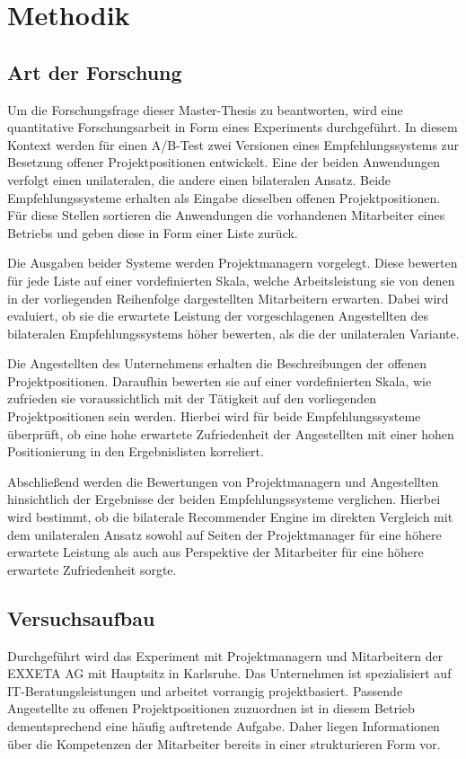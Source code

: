 \chapter{Methodik}
\label{ch:methodik}

\section{Art der Forschung}
\label{ch:methodik:art}
Um die Forschungsfrage dieser Master-Thesis zu beantworten, wird eine quantitative Forschungsarbeit in Form eines Experiments durchgeführt. In diesem Kontext werden für einen A/B-Test zwei Versionen eines Empfehlungssystems zur Besetzung offener Projektpositionen entwickelt. Eine der beiden Anwendungen verfolgt einen unilateralen, die andere einen bilateralen Ansatz. Beide Empfehlungssysteme erhalten als Eingabe dieselben offenen Projektpositionen. Für diese Stellen sortieren die Anwendungen die vorhandenen Mitarbeiter eines Betriebs und geben diese in Form einer Liste zurück.

Die Ausgaben beider Systeme werden Projektmanagern vorgelegt. Diese bewerten für jede Liste auf einer vordefinierten Skala, welche Arbeitsleistung sie von denen in der vorliegenden Reihenfolge dargestellten Mitarbeitern erwarten. Dabei wird evaluiert, ob sie die erwartete Leistung der vorgeschlagenen Angestellten des bilateralen Empfehlungssystems höher bewerten, als die der unilateralen Variante.

Die Angestellten des Unternehmens erhalten die Beschreibungen der offenen Projektpositionen. Daraufhin bewerten sie auf einer vordefinierten Skala, wie zufrieden sie voraussichtlich mit der Tätigkeit auf den vorliegenden Projektpositionen sein werden. Hierbei wird für beide Empfehlungssysteme überprüft, ob eine hohe erwartete Zufriedenheit der Angestellten mit einer hohen Positionierung in den Ergebnislisten korreliert.

Abschließend werden die Bewertungen von Projektmanagern und Angestellten hinsichtlich der Ergebnisse der beiden Empfehlungssysteme verglichen. Hierbei wird bestimmt, ob die bilaterale Recommender Engine im direkten Vergleich mit dem unilateralen Ansatz sowohl auf Seiten der Projektmanager für eine höhere erwartete Leistung als auch aus Perspektive der Mitarbeiter für eine höhere erwartete Zufriedenheit sorgte.

\section{Versuchsaufbau}
\label{ch:methodik:versuchsaufbau}
Durchgeführt wird das Experiment mit Projektmanagern und Mitarbeitern der EXXETA AG mit Hauptsitz in Karlsruhe. Das Unternehmen ist spezialisiert auf IT-Beratungsleistungen und arbeitet vorrangig projektbasiert. Passende Angestellte zu offenen Projektpositionen zuzuordnen ist in diesem Betrieb dementsprechend eine häufig auftretende Aufgabe. Daher liegen Informationen über die Kompetenzen der Mitarbeiter bereits in einer strukturieren Form vor.

